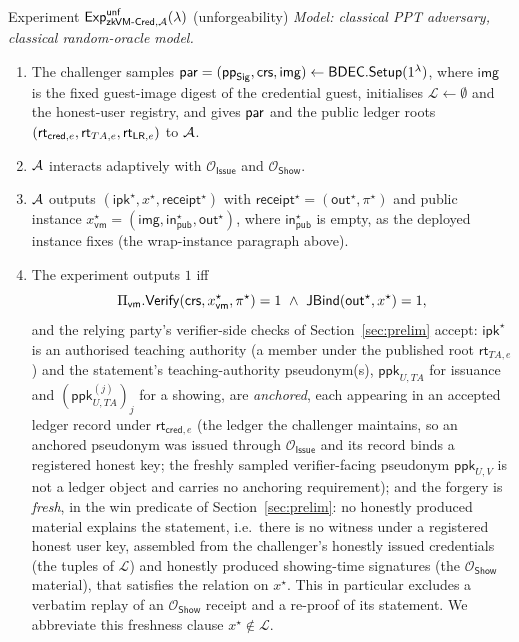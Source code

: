 \begin{gamebox}{Experiment $\mathsf{Exp}^{\mathsf{unf}}_{\mathsf{zkVM\text{-}Cred},\mathcal{A}}(\lambda)$ (unforgeability)}
    \emph{Model: classical PPT adversary, classical random-oracle model.}\par\smallskip
    \begin{enumerate}
        \item The challenger samples $\mathsf{par}=(\mathsf{pp}_{\mathsf{Sig}},\mathsf{crs},\mathsf{img})\leftarrow\mathsf{BDEC}.\mathsf{Setup}(1^\lambda)$, where $\mathsf{img}$ is the fixed guest-image digest of the credential guest, initialises $\mathcal L\gets\emptyset$ and the honest-user registry, and gives $\mathsf{par}$ and the public ledger roots $(\mathsf{rt}_{\mathsf{cred},e},\mathsf{rt}_{TA,e},\mathsf{rt}_{\mathsf{LR},e})$ to $\mathcal{A}$.
        \item $\mathcal{A}$ interacts adaptively with $\mathcal O_{\mathsf{Issue}}$ and $\mathcal O_{\mathsf{Show}}$.
        \item $\mathcal{A}$ outputs $(\mathsf{ipk}^\star,x^\star,\mathsf{receipt}^\star)$ with $\mathsf{receipt}^\star=(\mathsf{out}^\star,\pi^\star)$ and public instance $x_{\mathsf{vm}}^\star=(\mathsf{img},\mathsf{in}_{\mathsf{pub}}^\star,\mathsf{out}^\star)$, where $\mathsf{in}_{\mathsf{pub}}^\star$ is empty, as the deployed instance fixes (the wrap-instance paragraph above).
        \item The experiment outputs $1$ iff
        \begin{equation*}
          \Pi_{\mathsf{vm}}.\mathsf{Verify}(\mathsf{crs}, x_{\mathsf{vm}}^\star, \pi^\star)=1
          \ \land\
          \mathsf{JBind}(\mathsf{out}^\star,x^\star)=1,
        \end{equation*}
        and the relying party's verifier-side checks of Section~\ref{sec:prelim} accept: $\mathsf{ipk}^\star$ is an authorised teaching authority (a member under the published root $\mathsf{rt}_{TA,e}$) and the statement's teaching-authority pseudonym(s), $\mathsf{ppk}_{U,TA}$ for issuance and $(\mathsf{ppk}_{U,TA}^{(j)})_j$ for a showing, are \emph{anchored}, each appearing in an accepted ledger record under $\mathsf{rt}_{\mathsf{cred},e}$ (the ledger the challenger maintains, so an anchored pseudonym was issued through $\mathcal O_{\mathsf{Issue}}$ and its record binds a registered honest key; the freshly sampled verifier-facing pseudonym $\mathsf{ppk}_{U,V}$ is not a ledger object and carries no anchoring requirement); and the forgery is \emph{fresh}, in the win predicate of Section~\ref{sec:prelim}: no honestly produced material explains the statement, i.e.\ there is no witness under a registered honest user key, assembled from the challenger's honestly issued credentials (the tuples of $\mathcal L$) and honestly produced showing-time signatures (the $\mathcal O_{\mathsf{Show}}$ material), that satisfies the relation on $x^\star$. This in particular excludes a verbatim replay of an $\mathcal O_{\mathsf{Show}}$ receipt and a re-proof of its statement. We abbreviate this freshness clause $x^\star\notin\mathcal L$.

\end{enumerate}
\end{gamebox}
